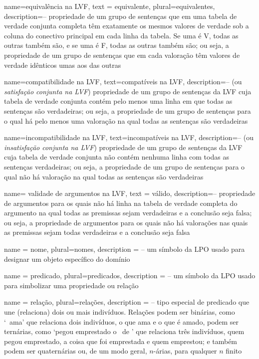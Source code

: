 {
 name=equivalência na LVF,
 text = equivalente,
 plural=equivalentes,
 description={-- propriedade de um grupo de sentenças que em uma tabela de verdade conjunta completa têm exatamente os mesmos valores de verdade sob a coluna do conectivo principal em cada linha da tabela. Se uma é V, todas as outras também são, e se uma é F, todas as outras também são; ou seja, a propriedade de um grupo de sentenças que em cada valoração têm valores de verdade idênticos umas aos das outras}
}

{
 name=compatibilidade na LVF,
 text=compatíveis na LVF,
 description={-- (ou \textit{satisfação conjunta na LVF}) propriedade de um grupo de sentenças da LVF cuja tabela de verdade conjunta contém pelo menos uma linha em que todas as sentenças são verdadeiras; ou seja, a propriedade de um grupo de sentenças para o qual há pelo menos uma valoração na qual todas as sentenças são verdadeiras}
}

{
 name=incompatibilidade na LVF,
 text=incompatíveis na LVF,
 description={-- (ou \textit{insatisfação conjunta na LVF}) propriedade de um grupo de sentenças da LVF cuja tabela de verdade conjunta não contém nenhuma linha com todas as sentenças verdadeiras; ou seja, a propriedade de um grupo de sentenças para o qual não há valoração na qual todas as sentenças são verdadeiras}
}

{
 name= validade de argumentos na LVF,
 text = válido,
 description={-- propriedade de argumentos para os quais não há linha na tabela de verdade completa do argumento na qual todas as premissas sejam verdadeiras e a conclusão seja falsa; ou seja, a propriedade de argumentos para os quais não há valorações nas quais as premissas sejam todas verdadeiras e a conclusão seja falsa}
}

{
 name = nome,
 plural=nomes,
 description = {-- um símbolo da LPO usado para designar um objeto específico do domínio}
}

{
 name = predicado,
 plural=predicados,
 description = {-- um símbolo da LPO usado para simbolizar uma propriedade ou relação}
}


{
 name = relação,
 plural=relações,
 description = {-- tipo especial de predicado que une (relaciona) dois ou mais indivíduos. Relações podem ser binárias, como `\blank\ ama\blank' que relaciona dois indivíduos, o que ama e o que é amado, podem ser ternárias, como `\blank pegou emprestado o \blank\ de \blank' que relaciona três indivíduos, quem pegou emprestado, a coisa que foi emprestada e quem emprestou; e também podem ser quaternárias ou, de um modo geral, $n$-árias, para qualquer $n$ finito}
}

